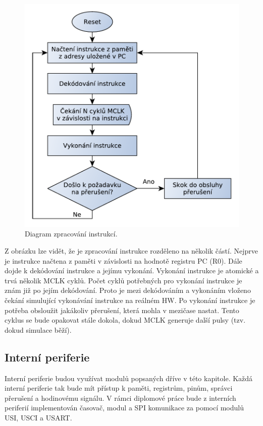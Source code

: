 \begin{figure}[h]
\centering
\includegraphics[trim=0cm 0cm 0cm 0cm, scale=0.7]{fig/msp430_inst}
\caption{Diagram zpracování instrukcí.}
\label{fig:msp430_inst}
\end{figure}

Z obrázku lze vidět, že je zpracování instrukce rozděleno na několik částí. Nejprve je instrukce načtena z paměti v závislosti na hodnotě registru PC (R0).
Dále dojde k dekódování instrukce a jejímu vykonání. Vykonání instrukce je atomické a trvá několik MCLK cyklů. Počet cyklů potřebných pro vykonání
instrukce je znám již po jejím dekódování. Proto je mezi dekódováním a vykonáním vloženo čekání simulující vykonávání instrukce na reálném HW.
Po vykonání instrukce je potřeba obsloužit jakákoliv přerušení, která mohla v mezičase nastat. Tento cyklus se bude opakovat stále dokola, dokud MCLK generuje další pulsy (tzv. dokud simulace běží).

\subsection{Interní periferie}

Interní periferie budou využívat modulů popsaných dříve v této kapitole. Každá interní periferie tak bude mít přístup k paměti, registrům, pinům, správci
přerušení a hodinovému signálu. V rámci diplomové práce bude z interních periferií implementován časovač, modul a SPI komunikace za pomocí modulů USI, USCI a USART.

